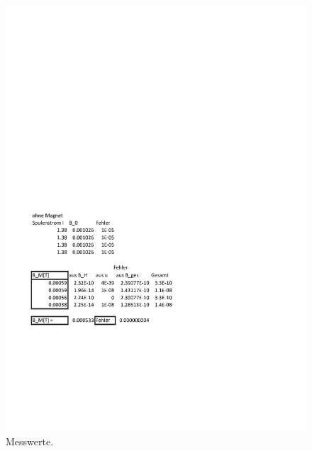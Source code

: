 \documentclass[a4paper,10pt]{scrartcl} %
\begin{document}
\begin{figure}
\begin{minipage}{0.65\textwidth}
\includegraphics[width=\textwidth]{Daten/Tabelle2.pdf}
\end{minipage}
\caption{Messwerte.}
\end{figure}
\newpage


\end{document}
